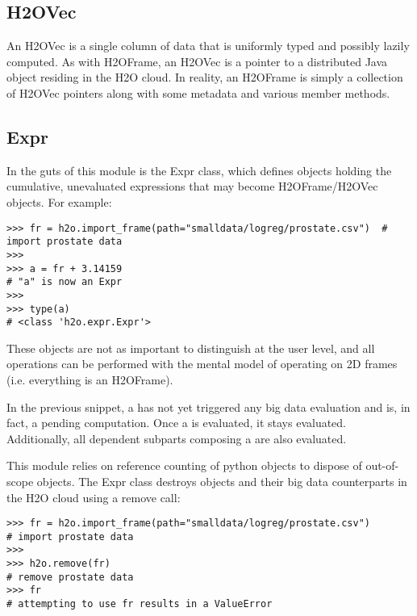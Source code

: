\subsection{H2OVec}

An H2OVec is a single column of data that is uniformly typed and possibly lazily computed. As with H2OFrame, an H2OVec is a pointer to a distributed Java object residing in the H2O cloud. In reality, an H2OFrame is simply a collection of H2OVec pointers along with some metadata and various member methods.

\subsection{Expr}

In the guts of this module is the Expr class, which defines objects holding the cumulative, unevaluated expressions that may become H2OFrame/H2OVec objects. For example:

\begin{lstlisting}[style=python]
>>> fr = h2o.import_frame(path="smalldata/logreg/prostate.csv")  # import prostate data
>>>
>>> a = fr + 3.14159                         
# "a" is now an Expr
>>>
>>> type(a)                                        
# <class 'h2o.expr.Expr'>
\end{lstlisting}

These objects are not as important to distinguish at the user level, and all operations can be performed with the mental model of operating on 2D frames (i.e. everything is an H2OFrame).

In the previous snippet, a has not yet triggered any big data evaluation and is, in fact, a pending computation. Once a is evaluated, it stays evaluated. Additionally, all dependent subparts composing a are also evaluated.

This module relies on reference counting of python objects to dispose of out-of-scope objects. The Expr class destroys objects and their big data counterparts in the H2O cloud using a remove call:

\begin{lstlisting}[style=python]
>>> fr = h2o.import_frame(path="smalldata/logreg/prostate.csv")  
# import prostate data
>>>
>>> h2o.remove(fr)                                               
# remove prostate data
>>> fr                                                           
# attempting to use fr results in a ValueError
\end{lstlisting}


